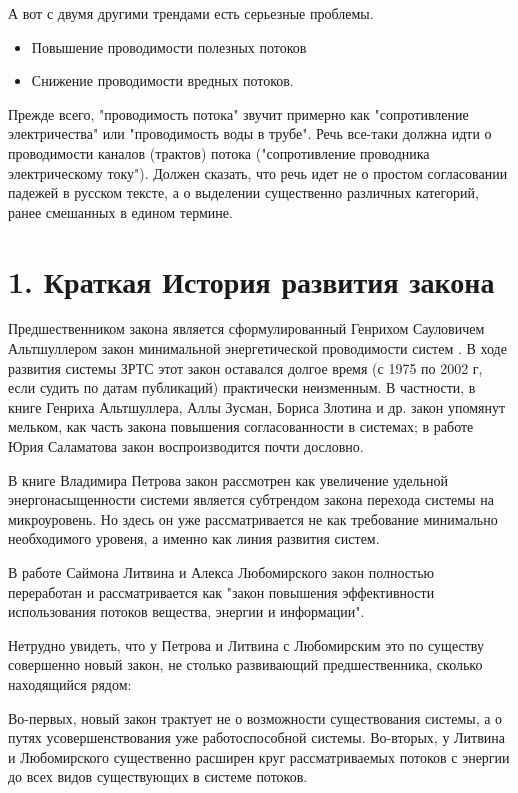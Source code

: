 \documentclass[a4paper,11pt]{article}
\begin{document}
А вот с двумя другими трендами есть серьезные проблемы.
\begin{itemize}
\item Повышение проводимости полезных потоков
\item Снижение проводимости вредных потоков.
\end{itemize}
Прежде всего, "проводимость потока" звучит примерно как "сопротивление
электричества" или "проводимость воды в трубе". Речь все-таки должна идти о
проводимости каналов (трактов) потока ("сопротивление проводника
электрическому току"). Должен сказать, что речь идет не о простом согласовании
падежей в русском тексте, а о выделении существенно различных категорий, ранее
смешанных в едином термине.

\section{1. Краткая История развития закона}

Предшественником закона является сформулированный Генрихом Сауловичем
Альтшуллером закон минимальной энергетической проводимости систем \cite{1}. В
ходе развития системы ЗРТС этот закон оставался долгое время (с 1975 по 2002
г, если судить по датам публикаций) практически неизменным. В частности, в
книге Генриха Альтшуллера, Аллы Зусман, Бориса Злотина и др. \cite{2} закон
упомянут мельком, как часть закона повышения согласованности в системах; в
работе Юрия Саламатова \cite{3} закон воспроизводится почти дословно.

В книге Владимира Петрова \cite{4} закон рассмотрен как увеличение удельной
энергонасыщенности системи является субтрендом закона перехода системы на
микроуровень. Но здесь он уже рассматривается не как требование минимально
необходимого уровеня, а именно как линия развития систем.

В работе Саймона Литвина и Алекса Любомирского \cite{5} закон полностью
переработан и рассматривается как "закон повышения эффективности использования
потоков вещества, энергии и информации".

Нетрудно увидеть, что у Петрова и Литвина с Любомирским это по существу
совершенно новый закон, не столько развивающий предшественника, сколько
находящийся рядом:

Во-первых, новый закон трактует не о возможности существования системы, а о
путях усовершенствования уже работоспособной системы. Во-вторых, у Литвина и
Любомирского существенно расширен круг рассматриваемых потоков с энергии до
всех видов существующих в системе потоков.
\end{document}
